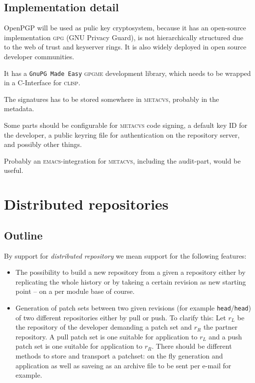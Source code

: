 \documentclass[fleqn, 10pt, a4paper]{article}
\begin{document}
\subsection{Implementation detail}
OpenPGP will be used as pulic key cryptosystem, because it has an
open-source implementation \textsc{gpg} (GNU Privacy Guard), is not
hierarchically structured due to the web of trust and keyserver rings.
It is also widely deployed in open source developer communities.

It has a \texttt{GnuPG Made Easy} \textsc{gpgme} development library,
which needs to be wrapped in a C-Interface for \textsc{clisp}.

The signatures has to be stored somewhere in \textsc{metacvs}, probably
in the metadata.

Some parts should be configurable for \textsc{metacvs} code signing,
a default key ID for the developer, a public keyring file for authentication
on the repository server, and possibly other things.

Probably an \textsc{emacs}-integration for \textsc{metacvs}, including the
audit-part, would be useful.


\section{Distributed repositories}

\subsection{Outline}

By support for \emph{distributed repository} we mean support for the following
features:

\begin{itemize}
\item The possibility to build a new repository from a given a 
repository either by replicating the whole history or
by takeing a certain revision as new starting point -- on a per module
base of course.
\item Generation of patch sets between two given revisions (for example
\texttt{head}/\texttt{head}) of two different repositories either by pull
or push. To clarify this: Let $r_L$ be the repository of the developer
demanding a patch set and $r_R$ the partner repository. A pull patch set
is one suitable for application to $r_L$ and a push patch set is one
suitable for application to $r_R$.
There should be different methods to store and transport a patchset:
on the fly generation and application as well as saveing as an archive file
to be sent per e-mail for example.
\end{itemize}
\end{document}
